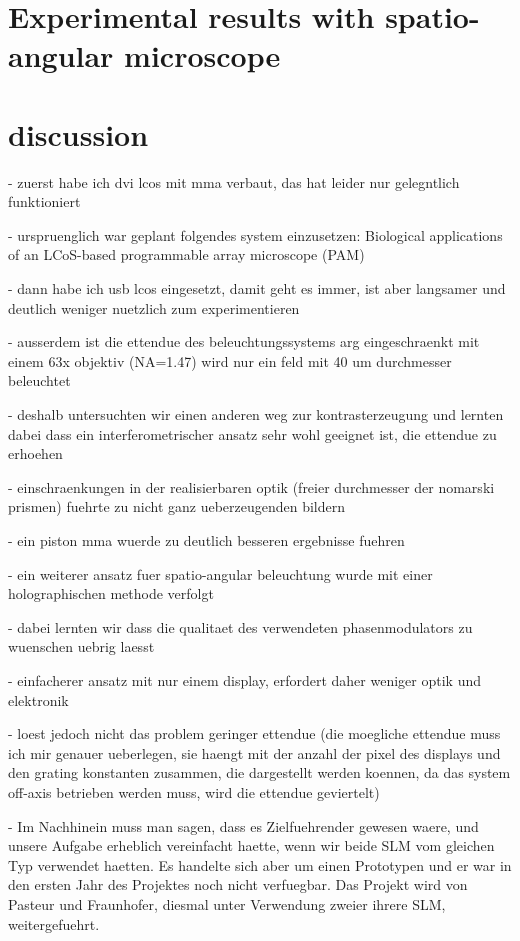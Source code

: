 \documentclass[oneside,a4paper,12pt,BCOR20mm,DIV14]{scrbook} %
\begin{document}
\chapter{Experimental results with spatio-angular microscope}
\label{sec:results}
\chapter{discussion}
\label{sec:discussion}
- zuerst habe ich dvi lcos mit mma verbaut, das hat leider nur
  gelegntlich funktioniert

- urspruenglich war geplant folgendes system einzusetzen: Biological
  applications of an LCoS-based programmable array microscope (PAM)

- dann habe ich usb lcos eingesetzt, damit geht es immer, ist aber
  langsamer und deutlich weniger nuetzlich zum experimentieren

- ausserdem ist die ettendue des beleuchtungssystems arg
  eingeschraenkt mit einem 63x objektiv (NA=1.47) wird nur ein feld
  mit 40 um durchmesser beleuchtet

- deshalb untersuchten wir einen anderen weg zur kontrasterzeugung und
  lernten dabei dass ein interferometrischer ansatz sehr wohl geeignet
  ist, die ettendue zu erhoehen

  - einschraenkungen in der realisierbaren optik (freier durchmesser
    der nomarski prismen) fuehrte zu nicht ganz ueberzeugenden bildern

  - ein piston mma wuerde zu deutlich besseren ergebnisse fuehren

- ein weiterer ansatz fuer spatio-angular beleuchtung wurde mit einer
  holographischen methode verfolgt

  - dabei lernten wir dass die qualitaet des verwendeten
    phasenmodulators zu wuenschen uebrig laesst

  - einfacherer ansatz mit nur einem display, erfordert daher weniger
    optik und elektronik

  - loest jedoch nicht das problem geringer ettendue (die moegliche
    ettendue muss ich mir genauer ueberlegen, sie haengt mit der
    anzahl der pixel des displays und den grating konstanten zusammen,
    die dargestellt werden koennen, da das system off-axis betrieben
    werden muss, wird die ettendue geviertelt)

- Im Nachhinein muss man sagen, dass es Zielfuehrender gewesen
    waere, und unsere Aufgabe erheblich vereinfacht haette, wenn wir
    beide SLM vom gleichen Typ verwendet haetten. Es handelte sich
    aber um einen Prototypen und er war in den ersten Jahr des
    Projektes noch nicht verfuegbar. Das Projekt wird von Pasteur und
    Fraunhofer, diesmal unter Verwendung zweier ihrere SLM,
    weitergefuehrt. 
\end{document}
